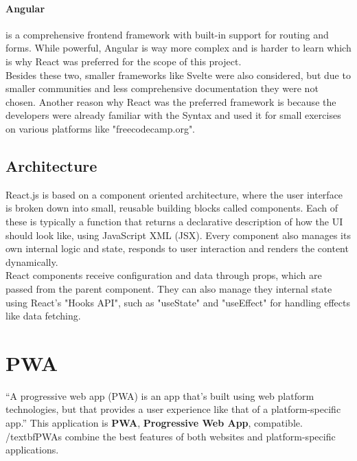 \documentclass[a4paper,12pt]{report}
\begin{document}
\paragraph{Angular} is a comprehensive frontend framework with built-in support for routing and forms. While powerful, Angular is way more complex and is harder to learn which is why React was preferred for the scope of this project. \cite{angular-docs} \\
Besides these two, smaller frameworks like Svelte were also considered, but due to smaller communities and less comprehensive documentation they were not chosen. Another reason why React was the preferred framework is because the developers were already familiar with the Syntax and used it for small exercises on various platforms like "freecodecamp.org".
\subsection{Architecture}
React.js is based on a component oriented architecture, where the user interface is broken down into small, reusable building blocks called components. Each of these is typically a function that returns a declarative description of how the UI should look like, using JavaScript XML (JSX). Every component also manages its own internal logic and state, responds to user interaction and renders the content dynamically. \\
React components receive configuration and data through props, which are passed from the parent component. They can also manage they internal state using React's "Hooks API", such as "useState" and "useEffect" for handling effects like data fetching. \cite{react-docs} \cite{mdn-react}

\section{PWA}
“A progressive web app (PWA) is an app that's built using web platform technologies, but that provides a user experience like that of a platform-specific app.”\parencite{mdn-pwa}
This application is \textbf{PWA}, \textbf{Progressive Web App}, compatible. /textbf{PWAs} combine the best features of both websites and platform-specific applications.\parencite{mdn-pwa}\\\\
\end{document}
